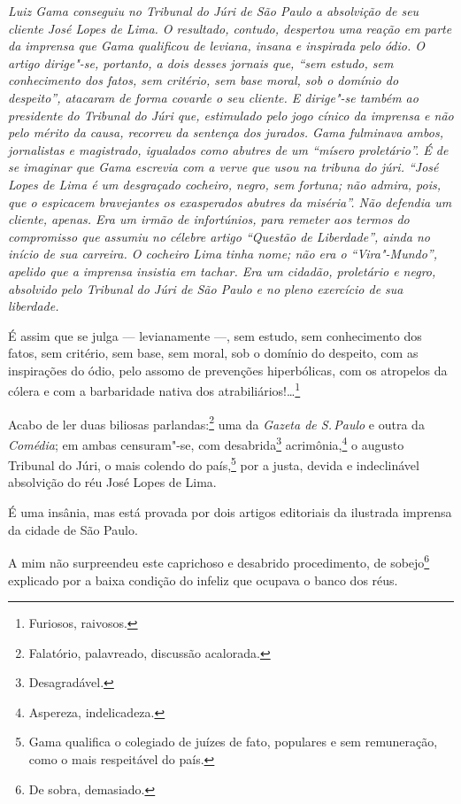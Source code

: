 \begin{flushleft}
{\footnotesize\itshape
Luiz Gama conseguiu no Tribunal
do Júri de São Paulo a absolvição de seu cliente José Lopes de Lima. O
resultado, contudo, despertou uma reação em parte da imprensa que Gama
qualificou de leviana, insana e inspirada pelo ódio. O artigo dirige"-se,
portanto, a dois desses jornais que, ``sem estudo, sem conhecimento dos
fatos, sem critério, sem base moral, sob o domínio do despeito'',
atacaram de forma covarde o seu cliente. E dirige"-se também ao presidente do
Tribunal do Júri que, estimulado pelo jogo cínico da imprensa e não pelo
mérito da causa, recorreu da sentença dos jurados. Gama fulminava ambos,
jornalistas e magistrado, igualados como abutres de um ``mísero
proletário''. É de se imaginar que Gama escrevia com a verve que usou na
tribuna do júri. ``José Lopes de Lima é um desgraçado cocheiro, negro,
sem fortuna; não admira, pois, que o espicacem bravejantes os
exasperados abutres da miséria''. Não defendia um cliente, apenas. Era um
irmão de infortúnios, para remeter aos termos do compromisso que assumiu
no célebre artigo ``Questão de Liberdade'', ainda no início de sua
carreira. O cocheiro Lima tinha nome; não era o ``Vira"-Mundo'', apelido
que a imprensa insistia em tachar. Era um cidadão, proletário e negro,
absolvido pelo Tribunal do Júri de São Paulo e no pleno exercício de sua
liberdade. }
\end{flushleft}

É assim que se julga --- levianamente ---, sem estudo, sem
conhecimento dos fatos, sem critério, sem base, sem moral, sob o domínio
do despeito, com as inspirações do ódio, pelo assomo de prevenções
hiperbólicas, com os atropelos da cólera e com a barbaridade nativa dos
atrabiliários!\ldots{}\footnote{Furiosos, raivosos.}

Acabo de ler duas biliosas parlandas:\footnote{Falatório, palavreado,
  discussão acalorada.} uma da \textit{Gazeta de S.\,Paulo} e outra da
\textit{Comédia}; em ambas censuram"-se, com desabrida\footnote{
  Desagradável.} acrimônia,\footnote{Aspereza, indelicadeza.} o
augusto Tribunal do Júri, o mais colendo do país,\footnote{Gama
  qualifica o colegiado de juízes de fato, populares e sem remuneração,
  como o mais respeitável do país.} por a justa, devida e indeclinável
absolvição do réu José Lopes de Lima.

É uma insânia, mas está provada por dois artigos editoriais da ilustrada
imprensa da cidade de São Paulo.

A mim não surpreendeu este caprichoso e desabrido procedimento, de
sobejo\footnote{De sobra, demasiado.} explicado por a baixa condição
do infeliz que ocupava o banco dos réus.


